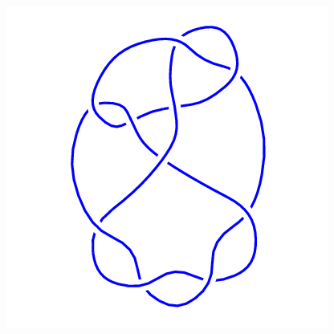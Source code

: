 \begin{figure}[H]
\begin{minipage}[b]{.18\linewidth}
    \end{minipage}
    \begin{minipage}[b]{.18\linewidth}
        \centering
        \includegraphics[width=\linewidth]{../data/10_126.png}
    \end{minipage}
\end{figure}
